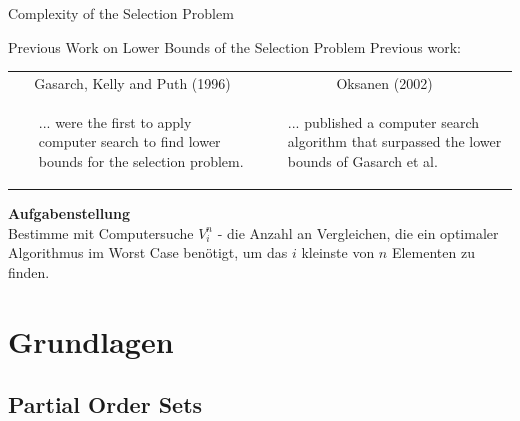 \begin{frame}{Complexity of the Selection Problem}
  
\end{frame}

\begin{frame}{Previous Work on Lower Bounds of the Selection Problem}
  \vspace{7mm}
  Previous work:\\
  \vspace{5mm}
  \begin{tabular}{|p{6cm}|p{6cm}|}
    \hline
    \multicolumn{1}{|c|}{Gasarch, Kelly and Puth (1996)}                                                                  & \multicolumn{1}{c|}{Oksanen (2002)} \\
    \cline{1-2}
    \raggedright \begin{itemize}
                   \item [...]were the first to apply computer search to find lower bounds for the selection problem.
                 \end{itemize} &
    \begin{itemize}
      \item[...] published a computer search algorithm that surpassed the lower bounds of Gasarch et al.
    \end{itemize}                                             \\
    \cline{1-2}
  \end{tabular}

\end{frame}

\begin{frame}{\insertsection}
  \textbf{Aufgabenstellung} \\
  \vspace{5mm}
  Bestimme mit Computersuche $V_i^n$ - die Anzahl an Vergleichen, die ein optimaler Algorithmus im Worst Case benötigt, um das $i$ kleinste von $n$ Elementen zu finden.

\end{frame}


\section{Grundlagen}

\subsection{Partial Order Sets}

